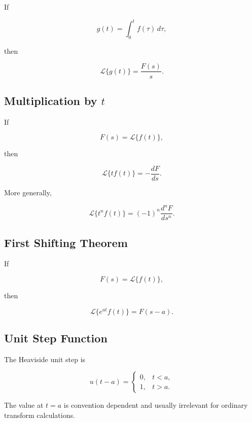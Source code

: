 If

\[
g(t)
=
\int_0^t
f(\tau)\,d\tau,
\]

then

\[
\boxed{
\mathcal{L}\{g(t)\}
=
\frac{
F(s)
}{
s
}.
}
\]

\subsection{Multiplication by \(t\)}
\label{subsec:laplace-multiplication-by-t}

If

\[
F(s)
=
\mathcal{L}\{f(t)\},
\]

then

\[
\boxed{
\mathcal{L}\{t f(t)\}
=
-\frac{dF}{ds}.
}
\]

More generally,

\[
\boxed{
\mathcal{L}\{t^nf(t)\}
=
(-1)^n
\frac{
d^nF
}{
ds^n
}.
}
\]

\subsection{First Shifting Theorem}
\label{subsec:laplace-first-shift}

If

\[
F(s)
=
\mathcal{L}\{f(t)\},
\]

then

\[
\boxed{
\mathcal{L}\{e^{at}f(t)\}
=
F(s-a).
}
\]

\subsection{Unit Step Function}
\label{subsec:unit-step-reference}

The Heaviside unit step is

\[
\boxed{
u(t-a)
=
\begin{cases}
0, & t<a,\\
1, & t>a.
\end{cases}
}
\]

The value at \(t=a\) is convention dependent and usually irrelevant for
ordinary transform calculations.

